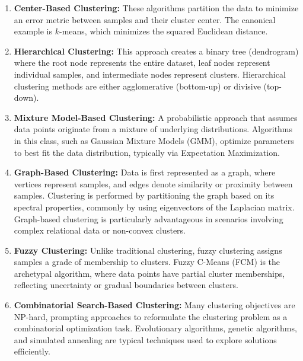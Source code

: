 \begin{enumerate}

    \item \textbf{Center-Based Clustering:} These algorithms partition the data to minimize an error metric between samples and their cluster center. The canonical example is \(k\)-means, which minimizes the squared Euclidean distance.

    \item \textbf{Hierarchical Clustering:} This approach creates a binary tree (dendrogram) where the root node represents the entire dataset, leaf nodes represent individual samples, and intermediate nodes represent clusters. Hierarchical clustering methods are either agglomerative (bottom-up) or divisive (top-down).

    \item \textbf{Mixture Model-Based Clustering:} A probabilistic approach that assumes data points originate from a mixture of underlying distributions. Algorithms in this class, such as Gaussian Mixture Models (GMM), optimize parameters to best fit the data distribution, typically via Expectation Maximization.

    \item \textbf{Graph-Based Clustering:} Data is first represented as a graph, where vertices represent samples, and edges denote similarity or proximity between samples. Clustering is performed by partitioning the graph based on its spectral properties, commonly by using eigenvectors of the Laplacian matrix. Graph-based clustering is particularly advantageous in scenarios involving complex relational data or non-convex clusters.

    \item \textbf{Fuzzy Clustering:} Unlike traditional clustering, fuzzy clustering assigns samples a grade of membership to clusters. Fuzzy C-Means (FCM) is the archetypal algorithm, where data points have partial cluster memberships, reflecting uncertainty or gradual boundaries between clusters.

    \item \textbf{Combinatorial Search-Based Clustering:} Many clustering objectives are NP-hard, prompting approaches to reformulate the clustering problem as a combinatorial optimization task. Evolutionary algorithms, genetic algorithms, and simulated annealing are typical techniques used to explore solutions efficiently.

\end{enumerate}

